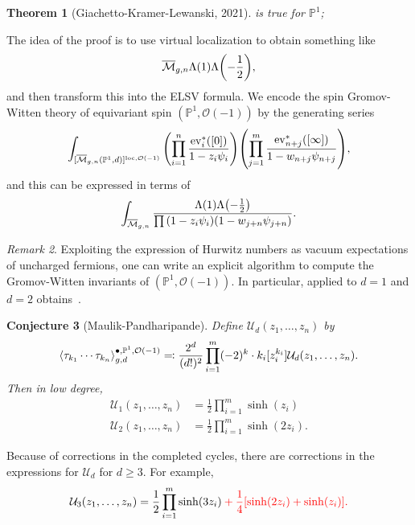 \documentclass[leqno, openany]{memoir}
\newtheorem{thm}{Theorem}[section]
\newtheorem{conj}[thm]{Conjecture}
\theoremstyle{definition}
\theoremstyle{remark}
\newtheorem{rmk}[thm]{Remark}
\theoremstyle{plain}
\theoremstyle{definition}
\theoremstyle{remark}
\renewcommand{\P}{\mathbb{P}}
\newcommand{\mc}[1]{\mathcal{#1}}
\newcommand{\mr}[1]{\mathrm{#1}}
\newcommand{\on}[1]{\operatorname{#1}}
\newcommand{\ol}[1]{\overline{#1}}
\begin{document}
\begin{thm}[Giachetto-Kramer-Lewanski, 2021]
 is true for $\P^1$;
\end{thm}

The idea of the proof is to use virtual localization to obtain something like
\[ \ol{\mc{M}}_{g,n} \Lambda(1) \Lambda \qty(-\frac{1}{2}), \]
and then transform this into the ELSV formula. We encode the spin Gromov-Witten theory of equivariant spin $(\P^1, \mc{O}(-1))$ by the generating series
\[ \int_{[\ol{\mc{M}}_{g,n}(\P^1,d)]^{\mr{loc}, \mc{O}(-1)}} \qty(\prod_{i=1}^n \frac{\on{ev}_i^*([0])}{1-z_i\psi_i}) \qty(\prod_{j=1}^m \frac{\on{ev}_{n+j}^*([\infty])}{1-w_{n+j}\psi_{n+j}}), \]
and this can be expressed in terms of
\[ \int_{\ol{\mc{M}}_{g,n}} \frac{\Lambda(1) \Lambda\qty(-\frac{1}{2})}{\prod \qty(1-z_i \psi_i)(1-w_{j+n}\psi_{j+n})}. \]

\begin{rmk}
Exploiting the expression of Hurwitz numbers as vacuum expectations of uncharged fermions, one can write an explicit algorithm to compute the Gromov-Witten invariants of $(\P^1, \mc{O}(-1))$. In particular, applied to $d=1$ and $d=2$ obtains~.
\end{rmk}

\begin{conj}[Maulik-Pandharipande]\label{conj:mp}
  Define $\mc{U}_d(z_1, \ldots, z_n)$ by
  \[ \ev{\tau_{k_1}\cdots\tau_{k_n}}_{g,d}^{\bullet, \P^1, \mc{O}(-1)} \eqqcolon \frac{2^d}{(d!)^2} \prod_{i=1}^m (-2)^k \cdot k_i [z_i^{k_i}] \mc{U}_d(z_1, \ldots, z_n). \]
  Then in low degree,
  \begin{align*}
    \mc{U}_1(z_1, \ldots, z_n) &= \frac{1}{2} \prod_{i=1}^m \sinh(z_i) \\
    \mc{U}_2(z_1, \ldots, z_n) &= \frac{1}{2} \prod_{i=1}^m \sinh(2z_i). 
  \end{align*}
\end{conj}
Because of corrections in the completed cycles, there are corrections in the expressions for $\mc{U}_d$ for $d \geq 3$. For example,
\[ \mc{U}_3(z_1, \ldots, z_n) = \frac{1}{2} \prod_{i=1}^m \sinh(3z_i) \color{red} + \frac{1}{4} \qty[\sinh(2z_i) + \sinh(z_i)]. \]
\end{document}
